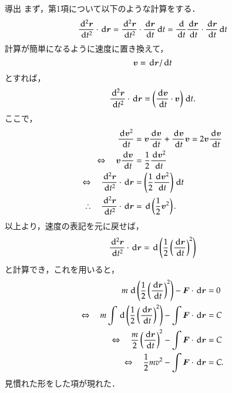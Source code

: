 \begin{mysmallsec}{導出}
                まず，第1項について以下のような計算をする．
                    \begin{align*}
                        \frac{\,\mathrm{d}^{2}\boldsymbol{r}}{\,\mathrm{d} t^{2}}\cdot \,\mathrm{d}\boldsymbol{r}
                        =\frac{\,\mathrm{d}^{2}\boldsymbol{r}}{\,\mathrm{d} t^{2}}\cdot \frac{\,\mathrm{d}\boldsymbol{r}}{\,\mathrm{d} t}\,\mathrm{d} t
                        =\frac{\,\mathrm{d} }{\,\mathrm{d} t}\frac{\,\mathrm{d}\boldsymbol{r}}{\,\mathrm{d} t}\cdot \frac{\,\mathrm{d}\boldsymbol{r}}{\,\mathrm{d} t}\,\mathrm{d} t
                    \end{align*}
                計算が簡単になるように速度に置き換えて，
                        \begin{equation*}
                                \boldsymbol{v}=\,\mathrm{d}\boldsymbol{r}/\,\mathrm{d} t
                        \end{equation*}
                とすれば，
                    \begin{align*}
                        \frac{\,\mathrm{d}^{2}\boldsymbol{r}}{\,\mathrm{d} t^{2}}\cdot \,\mathrm{d}\boldsymbol{r}
                        =\left(\frac{\,\mathrm{d}\boldsymbol{v}}{\,\mathrm{d} t}\cdot \boldsymbol{v}\right) \,\mathrm{d} t.
                    \end{align*}
                ここで，
                    \begin{align*}
                    \frac{\,\mathrm{d}\boldsymbol{v}^{2}}{\,\mathrm{d} t}&=\boldsymbol{v}\frac{\,\mathrm{d}\boldsymbol{v}}{\,\mathrm{d} t}
                    +\frac{\,\mathrm{d}\boldsymbol{v}}{\,\mathrm{d} t}\boldsymbol{v} = 2\boldsymbol{v}\frac{\,\mathrm{d}\boldsymbol{v}}{\,\mathrm{d} t} \\
                    \Leftrightarrow \quad
                    \boldsymbol{v}\frac{\,\mathrm{d}\boldsymbol{v}}{\,\mathrm{d} t}&=\frac{1}{2}\frac{\,\mathrm{d}\boldsymbol{v}^{2}}{\,\mathrm{d} t}\\
                    \Leftrightarrow \quad
                    \frac{\,\mathrm{d}^{2}\boldsymbol{r}}{\,\mathrm{d} t^{2}}\cdot \,\mathrm{d}\boldsymbol{r}&=
                    \left(\frac{1}{2}\frac{\,\mathrm{d}\boldsymbol{v}^{2}}{\,\mathrm{d} t}\right) \,\mathrm{d} t\\
                    \therefore \quad
                    \frac{\,\mathrm{d}^{2}\boldsymbol{r}}{\,\mathrm{d} t^{2}}\cdot \,\mathrm{d}\boldsymbol{r}&=\,\mathrm{d} \left(\frac{1}{2}\boldsymbol{v}^{2}\right).
                    \end{align*}
                以上より，速度の表記を元に戻せば，
                    \begin{align*}
                        \frac{\,\mathrm{d}^{2}\boldsymbol{r}}{\,\mathrm{d} t^{2}}\cdot \,\mathrm{d}\boldsymbol{r}=\,\mathrm{d} \left( \frac{1}{2}\left( \frac{\,\mathrm{d}\boldsymbol{r}}{\,\mathrm{d} t} \right)^{2} \right)
                    \end{align*}
                と計算でき，これを用いると，
                    \begin{align}\label{b}
                        m\,\df \left( \frac{1}{2}\left( \frac{\df\br}{\df t} \right)^{2} \right)
                        -\bF\cdot \df\br &= 0 \notag \\
                        \Leftrightarrow \quad m\int \df \left( \frac{1}{2}\left( \frac{\df\br}{\df t} \right)^{2} \right)
                        -\int \bF\cdot \df\br &= C \notag \\
                        \Leftrightarrow \quad\frac{m}{2}\left( \frac{\df\br}{\df t} \right)^{2}
                        -\int \bF\cdot \df\br &= C \notag \\
                        \Leftrightarrow \quad\frac{1}{2}mv^{2}
                        -\int \bF\cdot \df\br &= C.
                    \end{align}
                見慣れた形をした項が現れた．
            \end{mysmallsec}

